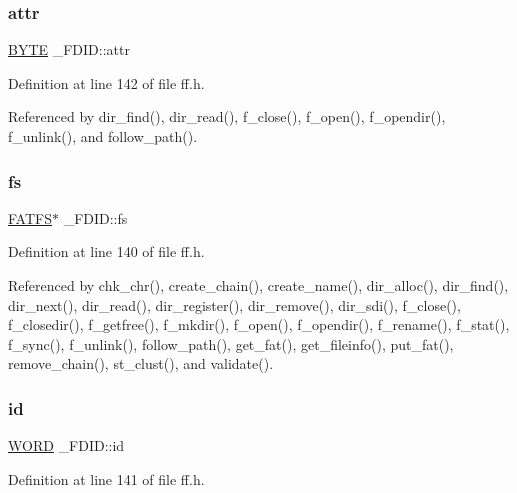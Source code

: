 \subsubsection{\texorpdfstring{attr}{attr}}
{\footnotesize\ttfamily \hyperlink{lz4_8c_a4ae1dab0fb4b072a66584546209e7d58}{B\+Y\+TE} \+\_\+\+F\+D\+I\+D\+::attr}



Definition at line 142 of file ff.\+h.



Referenced by dir\+\_\+find(), dir\+\_\+read(), f\+\_\+close(), f\+\_\+open(), f\+\_\+opendir(), f\+\_\+unlink(), and follow\+\_\+path().

\mbox{\label{struct__FDID_aefa4597d88e54bace32e6c15e11d9610}} 
\subsubsection{\texorpdfstring{fs}{fs}}
{\footnotesize\ttfamily \hyperlink{structFATFS}{F\+A\+T\+FS}$\ast$ \+\_\+\+F\+D\+I\+D\+::fs}



Definition at line 140 of file ff.\+h.



Referenced by chk\+\_\+chr(), create\+\_\+chain(), create\+\_\+name(), dir\+\_\+alloc(), dir\+\_\+find(), dir\+\_\+next(), dir\+\_\+read(), dir\+\_\+register(), dir\+\_\+remove(), dir\+\_\+sdi(), f\+\_\+close(), f\+\_\+closedir(), f\+\_\+getfree(), f\+\_\+mkdir(), f\+\_\+open(), f\+\_\+opendir(), f\+\_\+rename(), f\+\_\+stat(), f\+\_\+sync(), f\+\_\+unlink(), follow\+\_\+path(), get\+\_\+fat(), get\+\_\+fileinfo(), put\+\_\+fat(), remove\+\_\+chain(), st\+\_\+clust(), and validate().

\mbox{\label{struct__FDID_a363d7bdab408418b911ac1502bc22ea6}} 
\subsubsection{\texorpdfstring{id}{id}}
{\footnotesize\ttfamily \hyperlink{integer_8h_a197942eefa7db30960ae396d68339b97}{W\+O\+RD} \+\_\+\+F\+D\+I\+D\+::id}



Definition at line 141 of file ff.\+h.



